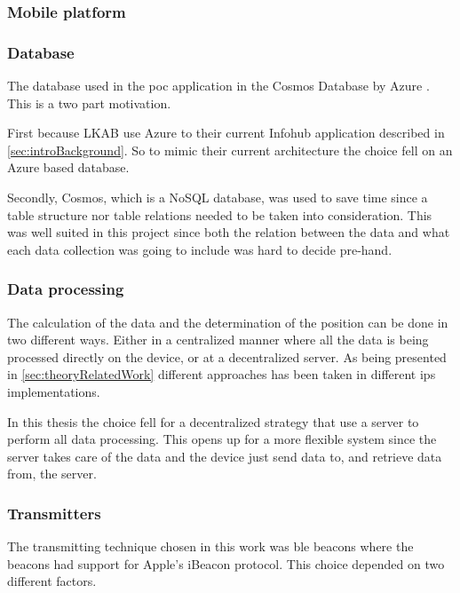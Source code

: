 \subsubsection{Mobile platform}\label{sec:methodSoftwareDesignMobilePlatform}


\subsubsection{Database}\label{sec:methodSoftwareDesignDatabase}
The database used in the \acrshort{poc} application in the Cosmos Database by Azure \cite{IntroductionAzureCosmos}.
This is a two part motivation.

\bigskip

First because LKAB use Azure to their current Infohub application described in \cref{sec:introBackground}.
So to mimic their current architecture the choice fell on an Azure based database.

\bigskip

Secondly, Cosmos, which is a NoSQL database, was used to save time since a table structure nor table relations needed to be taken into consideration.
This was well suited in this project since both the relation between the data and what each data collection was going to include was hard to decide pre-hand.


\subsubsection{Data processing}\label{sec:methodSoftwareDesignData}
The calculation of the data and the determination of the position can be done in two different ways.
Either in a centralized manner where all the data is being processed directly on the device, or at a decentralized server.
As being presented in \cref{sec:theoryRelatedWork} different approaches has been taken in different \acrshort{ips} implementations.

\bigskip

In this thesis the choice fell for a decentralized strategy that use a server to perform all data processing.
This opens up for a more flexible system since the server takes care of the data and the device just send data to, and retrieve data from, the server.


\subsubsection{Transmitters}\label{sec:methodSoftwareDesignTransmitters}
The transmitting technique chosen in this work was \acrfull{ble} beacons where the beacons had support for Apple's iBeacon protocol.
This choice depended on two different factors.

